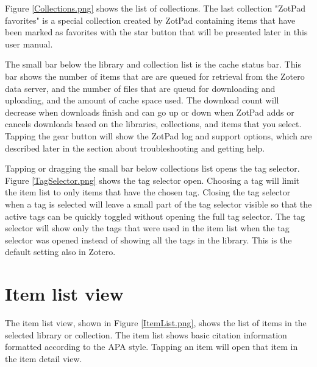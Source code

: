 \documentclass[oneside, openany, 12pt]{tufte-book}
\newcommand{\iphone}[1]{#1}
\newcommand{\image}[2]{
	\center
	\fbox{\texttt{[image: images/iPhone/\{\#2]}}}

	\caption{#1 \label{#2}}
	\smallskip\noindent\small Figure \ref{#2}: #1
	}
\newcommand{\ipadfootnote}[1]{}
\newcommand{\iphone}[1]{}
\newcommand{\image}[2]{
	\caption{#1}
	\label{#2}
	\fbox{\texttt{[image: images/iPad/\{\#2]}}}
	}
\newcommand{\ipadfootnote}[1]{\footnote{#1}}
\begin{document}
Figure \ref{Collections.png} shows the list of collections. The last collection "ZotPad favorites" is a special collection created by ZotPad containing items that have been marked as favorites with the star button that will be presented later in this user manual.

\begin{figure}
\image{Collections}{Collections.png}
\end{figure}

The small bar below the library and collection list is the cache status bar. This bar shows the number of items that are are queued for retrieval from the Zotero data server, and the number of files that are queud for downloading and uploading, and the amount of cache space used\ipadfootnote{The item downloads shows the number of toplevel items, attachments, and notes. For example, an article with an attachment and two notes is four items in the counter.}. The download count will decrease when downloads finish and can go up or down when ZotPad adds or cancels downloads based on the libraries, collections, and items that you select. Tapping the gear button will show the ZotPad log and support options, which are described later in the section about troubleshooting and getting help.
\clearpage

Tapping or dragging the small bar below collections list opens the tag selector. Figure \ref{TagSelector.png} shows the tag selector open. Choosing a tag will limit the item list to only items that have the chosen tag. Closing the tag selector when a tag is selected will leave a small part of the tag selector visible so that the active tags can be quickly toggled without opening the full tag selector. The tag selector will show only the tags that were used in the item list when the tag selector was opened instead of showing all the tags in the library. This is the default setting also in Zotero.

\begin{figure}
\image{Tag selector}{TagSelector.png}
\end{figure}


\FloatBarrier

\section{Item list view}

The item list view\iphone{, shown in Figure \ref{ItemList.png}, }shows the list of items in the selected library or collection. The item list shows basic citation information formatted according to the APA style. Tapping an item will open that item in the item detail view. 
\end{document}
